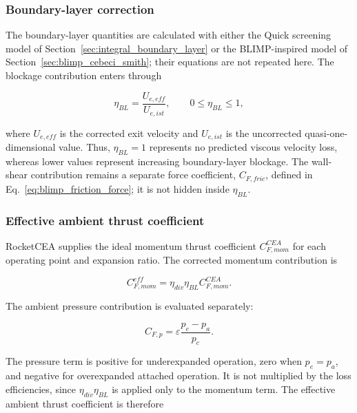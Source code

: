 \subsubsection{Boundary-layer correction}

The boundary-layer quantities are calculated with either the Quick screening model of
Section~\ref{sec:integral_boundary_layer} or the BLIMP-inspired model of
Section~\ref{sec:blimp_cebeci_smith}; their equations are not repeated here. The
blockage contribution enters through

\begin{equation}
\boxed{
\eta_{BL}
=
\frac{U_{e,eff}}{U_{e,ist}}
},
\qquad
0\leq\eta_{BL}\leq1,
\label{eq:boundary_layer_efficiency}
\end{equation}

where \(U_{e,eff}\) is the corrected exit velocity and \(U_{e,ist}\) is the
uncorrected quasi-one-dimensional value. Thus,
\(\eta_{BL}=1\) represents no predicted viscous velocity loss, whereas lower values
represent increasing boundary-layer blockage. The wall-shear contribution remains a
separate force coefficient, \(C_{F,fric}\), defined in
Eq.~\eqref{eq:blimp_friction_force}; it is not hidden inside \(\eta_{BL}\).

\subsubsection{Effective ambient thrust coefficient}

RocketCEA supplies the ideal momentum thrust coefficient
\(C_{F,mom}^{CEA}\) for each operating point and expansion ratio. The corrected
momentum contribution is

\begin{equation}
C_{F,mom}^{eff}
=
\eta_{div}\eta_{BL}C_{F,mom}^{CEA}.
\label{eq:corrected_momentum_cf}
\end{equation}

The ambient pressure contribution is evaluated separately:

\begin{equation}
C_{F,p}
=
\varepsilon\frac{p_e-p_a}{p_c}.
\label{eq:pressure_thrust_coefficient}
\end{equation}

The pressure term is positive for underexpanded operation, zero when \(p_e=p_a\), and
negative for overexpanded attached operation. It is not multiplied by the loss
efficiencies, since \(\eta_{div}\eta_{BL}\) is applied only to the momentum term. The
effective ambient thrust coefficient is therefore

